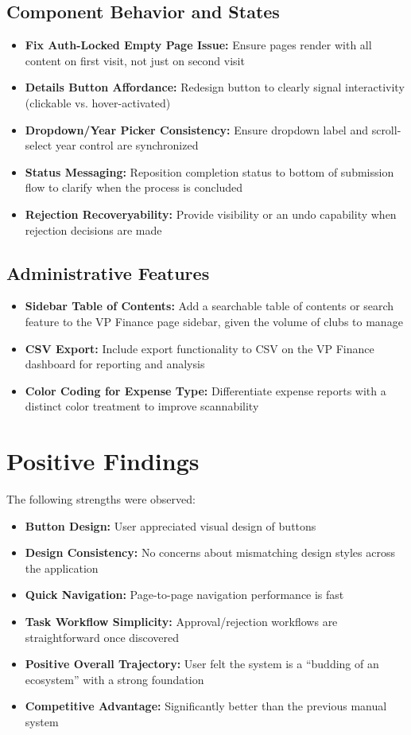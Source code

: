 \documentclass[12pt, titlepage]{article}
\begin{document}
\subsection{Component Behavior and States}
\begin{itemize}
    \item \textbf{Fix Auth-Locked Empty Page Issue:} Ensure pages render with all content on first visit, not just on second visit
    \item \textbf{Details Button Affordance:} Redesign button to clearly signal interactivity (clickable vs. hover-activated)
    \item \textbf{Dropdown/Year Picker Consistency:} Ensure dropdown label and scroll-select year control are synchronized
    \item \textbf{Status Messaging:} Reposition completion status to bottom of submission flow to clarify when the process is concluded
    \item \textbf{Rejection Recoveryability:} Provide visibility or an undo capability when rejection decisions are made
\end{itemize}

\subsection{Administrative Features}
\begin{itemize}
    \item \textbf{Sidebar Table of Contents:} Add a searchable table of contents or search feature to the VP Finance page sidebar, given the volume of clubs to manage
    \item \textbf{CSV Export:} Include export functionality to CSV on the VP Finance dashboard for reporting and analysis
    \item \textbf{Color Coding for Expense Type:} Differentiate expense reports with a distinct color treatment to improve scannability
\end{itemize}

\section{Positive Findings}

The following strengths were observed:
\begin{itemize}
    \item \textbf{Button Design:} User appreciated visual design of buttons
    \item \textbf{Design Consistency:} No concerns about mismatching design styles across the application
    \item \textbf{Quick Navigation:} Page-to-page navigation performance is fast
    \item \textbf{Task Workflow Simplicity:} Approval/rejection workflows are straightforward once discovered
    \item \textbf{Positive Overall Trajectory:} User felt the system is a ``budding of an ecosystem'' with a strong foundation
    \item \textbf{Competitive Advantage:} Significantly better than the previous manual system
\end{itemize}
\end{document}
